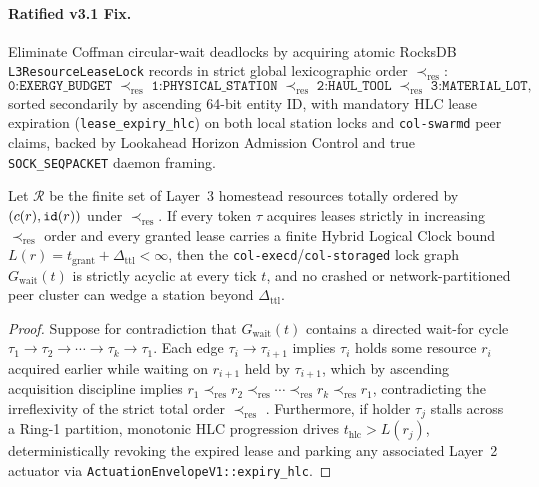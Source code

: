 \paragraph{Ratified v3.1 Fix.}
Eliminate Coffman circular-wait deadlocks \parencite{coffman1971deadlocks} by acquiring atomic RocksDB \texttt{L3ResourceLeaseLock} records in strict global lexicographic order $\prec_{\text{res}}$:
\[
  \texttt{0:EXERGY\_BUDGET} \;\prec_{\text{res}}\; \texttt{1:PHYSICAL\_STATION} \;\prec_{\text{res}}\; \texttt{2:HAUL\_TOOL} \;\prec_{\text{res}}\; \texttt{3:MATERIAL\_LOT},
\]
sorted secondarily by ascending 64-bit entity ID, with mandatory HLC lease expiration (\texttt{lease\_expiry\_hlc}) on both local station locks and \texttt{col-swarmd} peer claims, backed by Lookahead Horizon Admission Control and true \texttt{SOCK\_SEQPACKET} daemon framing.

\begin{theorem}
\label{thm:lexicographic-deadlock-freedom}
Let $\mathcal{R}$ be the finite set of Layer~3 homestead resources totally ordered by $(c(r), \text{\texttt{id}}(r))$ under $\prec_{\text{res}}$. If every token $\tau$ acquires leases strictly in increasing $\prec_{\text{res}}$ order and every granted lease carries a finite Hybrid Logical Clock bound $L(r) = t_{\text{grant}} + \Delta_{\text{ttl}} < \infty$, then the \texttt{col-execd}/\texttt{col-storaged} lock graph $G_{\text{wait}}(t)$ is strictly acyclic at every tick $t$, and no crashed or network-partitioned peer cluster can wedge a station beyond $\Delta_{\text{ttl}}$.
\end{theorem}

\begin{proof}
Suppose for contradiction that $G_{\text{wait}}(t)$ contains a directed wait-for cycle $\tau_1 \to \tau_2 \to \cdots \to \tau_k \to \tau_1$. Each edge $\tau_i \to \tau_{i+1}$ implies $\tau_i$ holds some resource $r_i$ acquired earlier while waiting on $r_{i+1}$ held by $\tau_{i+1}$, which by ascending acquisition discipline implies $r_1 \prec_{\text{res}} r_2 \prec_{\text{res}} \cdots \prec_{\text{res}} r_k \prec_{\text{res}} r_1$, contradicting the irreflexivity of the strict total order $\prec_{\text{res}}$ \parencite{coffman1971deadlocks}. Furthermore, if holder $\tau_j$ stalls across a Ring-1 partition, monotonic HLC progression drives $t_{\text{hlc}} > L(r_j)$, deterministically revoking the expired lease and parking any associated Layer~2 actuator via \texttt{ActuationEnvelopeV1::expiry\_hlc}.
\end{proof}

